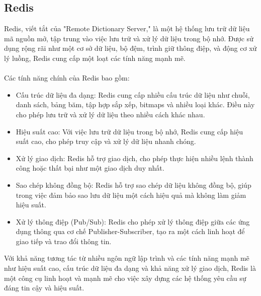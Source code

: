 \subsection{Redis}
Redis, viết tắt của "Remote Dictionary Server," là một hệ thống lưu trữ dữ liệu mã nguồn mở, tập trung vào việc lưu trữ và xử lý dữ liệu trong bộ nhớ. Được sử dụng rộng rãi như một cơ sở dữ liệu, bộ đệm, trình giữ thông điệp, và động cơ xử lý luồng, Redis cung cấp một loạt các tính năng mạnh mẽ.\\
\\
Các tính năng chính của Redis bao gồm:
\begin{itemize}
    \item Cấu trúc dữ liệu đa dạng: Redis cung cấp nhiều cấu trúc dữ liệu như chuỗi, danh sách, bảng băm, tập hợp sắp xếp, bitmaps và nhiều loại khác. Điều này cho phép lưu trữ và xử lý dữ liệu theo nhiều cách khác nhau.

    \item Hiệu suất cao: Với việc lưu trữ dữ liệu trong bộ nhớ, Redis cung cấp hiệu suất cao, cho phép truy cập và xử lý dữ liệu nhanh chóng.

    \item Xử lý giao dịch: Redis hỗ trợ giao dịch, cho phép thực hiện nhiều lệnh thành công hoặc thất bại như một giao dịch duy nhất.

    \item Sao chép không đồng bộ: Redis hỗ trợ sao chép dữ liệu không đồng bộ, giúp trong việc đảm bảo sao lưu dữ liệu một cách hiệu quả mà không làm giảm hiệu suất.

    \item Xử lý thông điệp (Pub/Sub): Redis cho phép xử lý thông điệp giữa các ứng dụng thông qua cơ chế Publisher-Subscriber, tạo ra một cách linh hoạt để giao tiếp và trao đổi thông tin.
\end{itemize}
Với khả năng tương tác từ nhiều ngôn ngữ lập trình và các tính năng mạnh mẽ như hiệu suất cao, cấu trúc dữ liệu đa dạng và khả năng xử lý giao dịch, Redis là một công cụ linh hoạt và mạnh mẽ cho việc xây dựng các hệ thống yêu cầu sự đáng tin cậy và hiệu suất.
